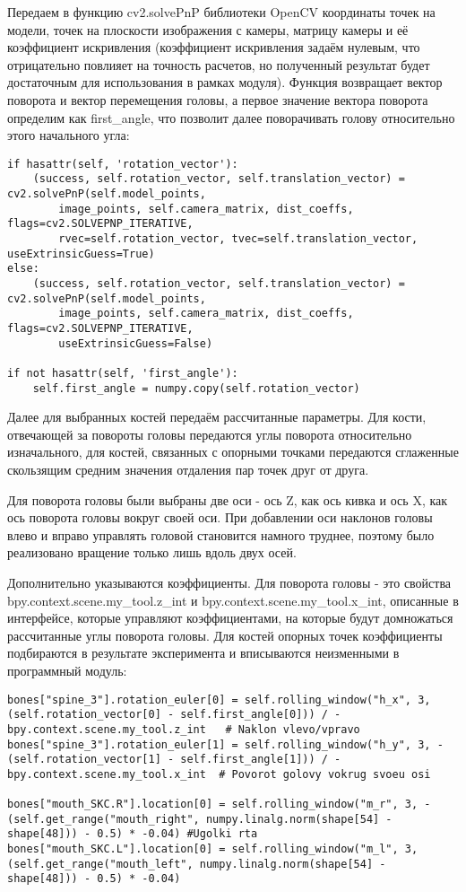 Передаем в функцию cv2.solvePnP библиотеки OpenCV координаты точек на модели, точек на плоскости изображения с камеры, матрицу камеры и её коэффициент искривления (коэффициент искривления задаём нулевым, что отрицательно повлияет на точность расчетов, но полученный результат будет достаточным для использования в рамках модуля). Функция возвращает вектор поворота и вектор перемещения головы, а первое значение вектора поворота определим как first\_angle, что позволит далее поворачивать голову относительно этого начального угла: 

\begin{lstlisting}
if hasattr(self, 'rotation_vector'):
	(success, self.rotation_vector, self.translation_vector) = cv2.solvePnP(self.model_points, 
		image_points, self.camera_matrix, dist_coeffs, flags=cv2.SOLVEPNP_ITERATIVE, 
		rvec=self.rotation_vector, tvec=self.translation_vector, useExtrinsicGuess=True)
else:
	(success, self.rotation_vector, self.translation_vector) = cv2.solvePnP(self.model_points, 
		image_points, self.camera_matrix, dist_coeffs, flags=cv2.SOLVEPNP_ITERATIVE, 
		useExtrinsicGuess=False)
		
if not hasattr(self, 'first_angle'):
	self.first_angle = numpy.copy(self.rotation_vector)
\end{lstlisting}

Далее для выбранных костей передаём рассчитанные параметры. Для кости, отвечающей за повороты головы передаются углы поворота относительно изначального, для костей, связанных с опорными точками передаются сглаженные скользящим средним значения отдаления пар точек друг от друга.

Для поворота головы были выбраны две оси - ось Z, как ось кивка и ось X, как ось поворота головы вокруг своей оси. При добавлении оси наклонов головы влево и вправо управлять головой становится намного труднее, поэтому было реализовано вращение только лишь вдоль двух осей.

Дополнительно указываются коэффициенты. Для поворота головы  - это свойства  bpy.context.scene.my\_tool.z\_int и bpy.context.scene.my\_tool.x\_int, описанные в интерфейсе, которые управляют коэффициентами, на которые будут домножаться рассчитанные углы поворота головы. Для костей опорных точек коэффициенты подбираются в результате эксперимента и вписываются неизменными в программный модуль:
\begin{lstlisting}
bones["spine_3"].rotation_euler[0] = self.rolling_window("h_x", 3, (self.rotation_vector[0] - self.first_angle[0])) / -bpy.context.scene.my_tool.z_int   # Naklon vlevo/vpravo
bones["spine_3"].rotation_euler[1] = self.rolling_window("h_y", 3, -(self.rotation_vector[1] - self.first_angle[1])) / -bpy.context.scene.my_tool.x_int  # Povorot golovy vokrug svoeu osi

bones["mouth_SKC.R"].location[0] = self.rolling_window("m_r", 3, -(self.get_range("mouth_right", numpy.linalg.norm(shape[54] - shape[48])) - 0.5) * -0.04) #Ugolki rta
bones["mouth_SKC.L"].location[0] = self.rolling_window("m_l", 3, (self.get_range("mouth_left", numpy.linalg.norm(shape[54] - shape[48])) - 0.5) * -0.04)
\end{lstlisting}

